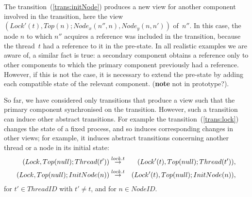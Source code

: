 The transition~(\ref{trans:initNode}) produces a new view for
another component involved in the transition, here the view $(Lock'(t),
Top(n); Node_x(n'', n), Node_y(n, n'))$ of~$n''$.  In this case, the node $n$
to which $n''$ acquires a reference was included in the transition, because
the thread~$t$ had a reference to it in the pre-state.  In all realistic
examples we are aware of, a similar fact is true: a secondary component
obtains a reference only to other components to which the primary component
previously had a reference.  However, if this is not the case, it is necessary
to extend the pre-state by adding each compatible state of the relevant
component.  (\textbf{note} not in prototype?).


So far, we have considered only transitions that produce a view such that the
primary component synchronised on the transition.  However, such a transition
can induce other abstract transitions.  For example the
transition~(\ref{trans:lock}) changes the state of a fixed process, and so
induces corresponding changes in other views; for example, it induces abstract
transitions concerning another thread or a node in its initial state:
%
\begin{eqnarray*}
(Lock, Top(null); Thread(t')) & \stackrel{lock.t}\rightarrow & 
  (Lock'(t), Top(null); Thread(t')), \\
(Lock, Top(null); InitNode(n)) & \stackrel{lock.t}\rightarrow & 
  (Lock'(t), Top(null); InitNode(n)),
\end{eqnarray*}
%
for $t' \in ThreadID$ with $t' \ne t$, and for $n \in NodeID$.




